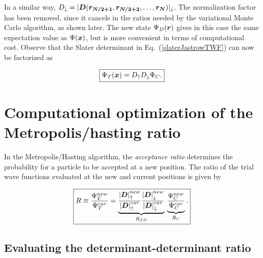 In a similar way, $D_\downarrow = |\boldsymbol{D}(\boldsymbol{r_{N/2+1}}, \boldsymbol{r_{N/2+2}},\ldots,\boldsymbol{r_{N}})|_{\downarrow}$. The normalization factor has been removed, since it cancels in the ratios needed by the variational Monte Carlo algorithm, as shown later. The new state $\Psi_D(\boldsymbol{r})$ gives in this case the same expectation value as $\Psi(\boldsymbol{x})$, but is more convenient in terms of computational cost. Observe that the Slater determinant in Eq.~(\ref{slaterJastrowTWF}) can now be factorized as

\begin{equation}\label{detDetJas}
 \boxed{\Psi_T(\boldsymbol{x})  = D_\uparrow D_\downarrow \Psi_C.}
\end{equation}


\section{Computational optimization of the Metropolis/hasting ratio}\label{psi_psi_ratio}

In the Metropolis/Hasting algorithm, the \emph{acceptance ratio} determines the probability for a particle to be accepted at a new position. The ratio of the trial wave functions evaluated at the new and current positions is given by

\begin{equation}\label{acceptanceRatio}
\boxed{R \equiv \frac{\Psi_{T}^{new}}{\Psi_{T}^{cur}} = \underbrace{\frac{{|\boldsymbol{D}|}_{\uparrow}^{new}}{{|\boldsymbol{D}|}_{\uparrow}^{cur}} \frac{{|\boldsymbol{D}|}_{\downarrow}^{new}}{{|\boldsymbol{D}|}_{\downarrow}^{cur}}}_{R_{SD}}\, \underbrace{\frac{\Psi_{C}^{new}}{\Psi_{C}^{cur}}}_{R_{C}}.}
\end{equation}


\subsection{Evaluating the determinant-determinant ratio}


